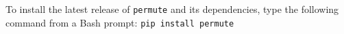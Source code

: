 To install the latest release of \texttt{permute} and its dependencies, type
the following command from a Bash prompt: \texttt{pip install permute}
